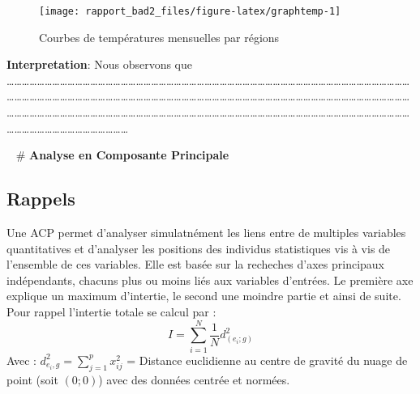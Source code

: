 \documentclass[
]{article}
\begin{document}
\begin{figure}[h]

{\centering \texttt{[image: rapport\_bad2\_files/figure-latex/graphtemp-1]} 

}

\caption{Courbes de températures mensuelles par régions}\label{fig:graphtemp}
\end{figure}

\textbf{Interpretation}: Nous observons que
\ldots\ldots\ldots\ldots\ldots\ldots\ldots\ldots\ldots\ldots\ldots\ldots\ldots\ldots\ldots\ldots\ldots\ldots\ldots\ldots\ldots\ldots\ldots\ldots\ldots\ldots\ldots\ldots\ldots\ldots\ldots\ldots\ldots\ldots\ldots\ldots\ldots\ldots\ldots\ldots\ldots\ldots\ldots\ldots\ldots\ldots\ldots\ldots\ldots\ldots\ldots\ldots\ldots\ldots\ldots\ldots\ldots\ldots\ldots\ldots\ldots\ldots\ldots\ldots\ldots\ldots\ldots\ldots\ldots\ldots\ldots\ldots\ldots\ldots\ldots\ldots\ldots\ldots\ldots\ldots\ldots\ldots\ldots\ldots\ldots\ldots\ldots\ldots\ldots\ldots\ldots\ldots\ldots\ldots\ldots\ldots\ldots\ldots\ldots\ldots\ldots\ldots\ldots\ldots\ldots\ldots\ldots\ldots\ldots\ldots\ldots\ldots\ldots\ldots\ldots\ldots\ldots\ldots\ldots\ldots\ldots\ldots\ldots\ldots\ldots\ldots\ldots\ldots\ldots\ldots\ldots\ldots\ldots\ldots\ldots\ldots\ldots\ldots\ldots\ldots\ldots\ldots\ldots\ldots\ldots\ldots\ldots\ldots\ldots\ldots\ldots\ldots\ldots\ldots\ldots\ldots\ldots\ldots\ldots\ldots\ldots\ldots\ldots\ldots\ldots\ldots\ldots\ldots\ldots\ldots\ldots\ldots\ldots\ldots\ldots{}

~ \# \textbf{Analyse en Composante Principale}

\hypertarget{rappels}{%
\subsection{\texorpdfstring{\textbf{Rappels}}{Rappels}}\label{rappels}}

Une ACP permet d'analyser simulatnément les liens entre de multiples
variables quantitatives et d'analyser les positions des individus
statistiques vis à vis de l'ensemble de ces variables. Elle est basée
sur la recheches d'axes principaux indépendants, chacuns plus ou moins
liés aux variables d'entrées. Le première axe explique un maximum
d'intertie, le second une moindre partie et ainsi de suite. Pour rappel
l'intertie totale se calcul par :
\[I=\sum^N_{i=1}\frac{1}{N}d^2_{(e_i;g)}\] Avec :
\(d^2_{e_i,g}=\sum^p_{j=1}x^2_{ij}\) = Distance euclidienne au centre de
gravité du nuage de point (soit \((0;0)\)) avec des données centrée et
normées.
\end{document}
